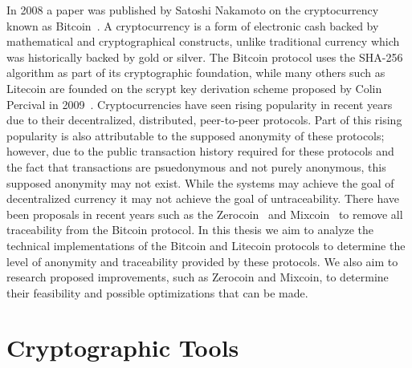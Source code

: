 \documentclass[11pt]{article}
\begin{document}
In 2008 a paper was published by Satoshi Nakamoto on the cryptocurrency known as Bitcoin~\cite{nakamoto08}.
A cryptocurrency is a form of electronic cash backed by mathematical and
cryptographical constructs, unlike traditional currency which was historically
backed by gold or silver. The Bitcoin protocol uses the SHA-256 algorithm as
part of its cryptographic foundation, while many others such as Litecoin are
founded on the scrypt key derivation scheme proposed by Colin Percival in
2009~\cite{percival09}.  Cryptocurrencies have seen rising popularity in recent
years due to their decentralized, distributed, peer-to-peer protocols. Part of
this rising popularity is also attributable to the supposed anonymity of these
protocols; however, due to the public transaction history required for these
protocols and the fact that transactions are psuedonymous and not purely
anonymous, this supposed anonymity may not exist. While the systems may achieve
the goal of decentralized currency it may not achieve the goal of
untraceability. There have been proposals in recent years such as the
Zerocoin~\cite{miers13} and Mixcoin~\cite{bonneau14} to remove all traceability
from the Bitcoin protocol. In this thesis we aim to analyze the technical
implementations of the Bitcoin and Litecoin protocols to determine the level of
anonymity and traceability provided by these protocols. We also aim to research
proposed improvements, such as Zerocoin and Mixcoin, to determine their
feasibility and possible optimizations that can be made.

\section{Cryptographic Tools}
\end{document}
